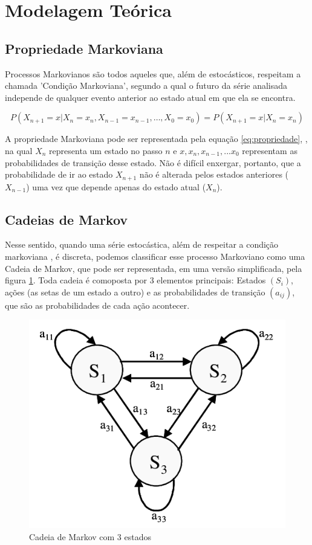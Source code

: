 \section{Modelagem Teórica}
\subsection{Propriedade Markoviana}

Processos Markovianos são todos aqueles que, além de estocásticos, respeitam a chamada 'Condição Markoviana', segundo a qual o futuro da série analisada independe de qualquer evento anterior ao estado atual em que ela se encontra. 

\begin{equation}
    P(X_{n+1} = x | X_n = x_n, X_{n-1} = x_{n-1}, \dots, X_0 = x_0) = P(X_{n+1} = x | X_n = x_n)
    \label{eq:propriedade}
\end{equation}


A propriedade Markoviana pode ser representada pela equação \ref{eq:propriedade}, \cite{Ross97}, na qual $X_{n}$ representa um estado no passo $n$ e $x , x_n, x_{n-1}, ... x_0$ representam as probabilidades de transição desse estado. Não é difícil enxergar, portanto, que a probabilidade de ir ao estado $X_{n+1}$ não é alterada pelos estados anteriores ($X_{n-1}$) uma vez que depende apenas do estado atual ($X_n$).

\subsection{Cadeias de Markov}

Nesse sentido, quando uma série estocástica, além de respeitar a condição markoviana , é discreta, podemos classificar esse processo Markoviano como uma Cadeia de Markov, que pode ser representada, em uma versão simplificada, pela figura \ref{fig:cadeia_01}.
Toda cadeia é comoposta por 3 elementos principais: Estados $(S_i)$, ações (as setas de um estado a outro) e as probabilidades de transição $(a_{ij})$, que são as probabilidades de cada ação acontecer.


\begin{figure}[!h]
\graphicspath{{relatorios/grupo3/Imagens/}}
    \centering
    \includegraphics[width=0.5\linewidth]{A-Markov-chain-with-3-states.png}
    \caption{Cadeia de Markov com 3 estados}
    \label{fig:cadeia_01}
\end{figure}

